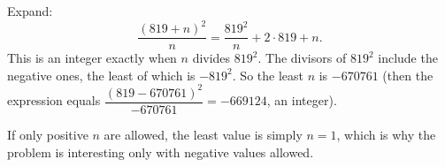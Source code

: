 Expand:
\[
\dfrac{(819+n)^2}{n}=\dfrac{819^2}{n}+2\cdot819+n .
\]
This is an integer exactly when $n$ divides $819^2$. The divisors of $819^2$ include the negative ones, the least of which is $-819^2$. So the least $n$ is $\boxed{-670761}$ (then the expression equals $\dfrac{(819-670761)^2}{-670761}=-669124$, an integer).

If only positive $n$ are allowed, the least value is simply $n=1$, which is why the problem is interesting only with negative values allowed.
